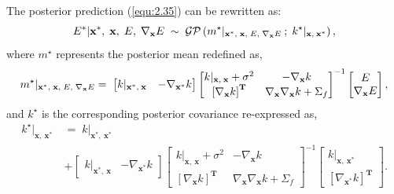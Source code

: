 The posterior prediction (\ref{equ:2.35}) can be rewritten as:
\begin{equation}
    \label{equ:2.43}
        E^{*}|\mathbf{x}^{*},\;\mathbf{x},\;E,\;\nabla_{\mathbf{x}} E\\
        \;\;\mathtt{\sim}\;\;
        \mathcal{GP}\left(
        m^{\star}|_{\mathbf{x}^{*},\;\mathbf{x},\;E,\;\nabla_{\mathbf{x}} E}\:
         ;\; k^{\star}|_{\mathbf{x},\:\mathbf{x}^{*}}\\
             \right),
\end{equation}
where $m^{\star}$ represents the posterior mean redefined as,
\begin{equation}
    \label{equ:2.44}
        m^{\star}|_{\mathbf{x}^{*},\;\mathbf{x},\;E,\;\nabla_{\mathbf{x}} E}\:\\
         = \;\begin{bmatrix}
             k|_{\mathbf{x}^{*},\:\mathbf{x}} & -\nabla_{\mathbf{x}^{*}} k 
         \end{bmatrix}
         \begin{bmatrix}
             k|_{\mathbf{x},\:\mathbf{x}}+\sigma^{2} & -\nabla_{\mathbf{x}} k \\
             \left[\nabla_{\mathbf{x}} k\right]^{\textbf{T}}  & \nabla_{\mathbf{x}}\nabla_{\mathbf{x}} k +\Sigma_{f}
         \end{bmatrix}^{-1}
         \begin{bmatrix}
         E\\
         \nabla_{\mathbf{x}} E
         \end{bmatrix},
\end{equation}
and $k^{\star}$ is the corresponding posterior covariance re-expressed as,
\begin{equation}
    \label{equ:2.45}
    \begin{split}
         k^{\star}|_{\mathbf{x},\:\mathbf{x}^{*}}\:
         &= \; k|_{\mathbf{x}^{*},\:\mathbf{x}^{*}} \\
         &+
         \begin{bmatrix}
             k|_{\mathbf{x}^{*},\:\mathbf{x}} & -\nabla_{\mathbf{x}^{*}} k 
         \end{bmatrix}
         \begin{bmatrix}
             k|_{\mathbf{x},\:\mathbf{x}}+\sigma^{2} & -\nabla_{\mathbf{x}} k \\
             \left[\nabla_{\mathbf{x}} k\right]^{\textbf{T}}  & \nabla_{\mathbf{x}}\nabla_{\mathbf{x}} k +\Sigma_{f}
         \end{bmatrix}^{-1}
         \begin{bmatrix}
             k|_{\mathbf{x},\:\mathbf{x}^{*}}\\
            \left[\nabla_{\mathbf{x}^{*}} k\right]^{\textbf{T}}
         \end{bmatrix}.
    \end{split}
\end{equation}

